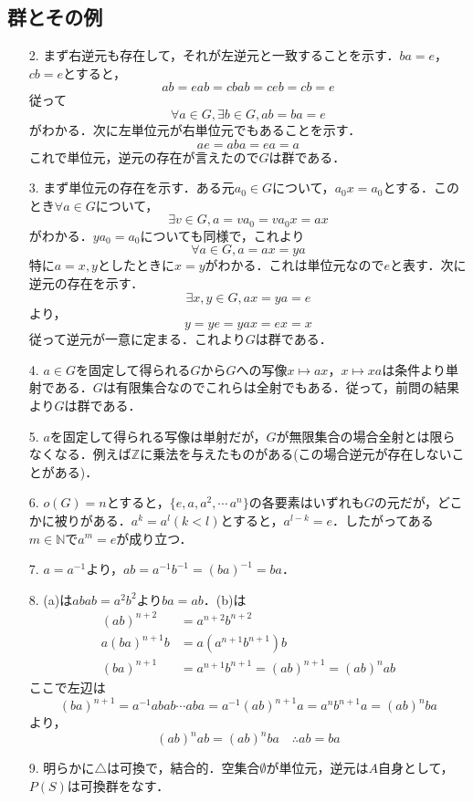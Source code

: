 \documentclass[a4paper,10pt,uplatex]{jsarticle}
\newcommand{\N}{\mathbb{N}}
\newcommand{\Z}{\mathbb{Z}}
\newcommand{\inv}[1]{{(#1)}^{-1}}
\numberwithin{equation}{section}
\theoremstyle{mystyle}
\begin{document}
\subsection{群とその例}
\begin{itemize}
    \item[2.] まず右逆元も存在して，それが左逆元と一致することを示す．$ba = e$，$cb=e$とすると，
    \[ ab = eab = cbab = ceb = cb = e \]
    従って
    \[ \forall a \in G, \exists b \in G, ab = ba = e \]
    がわかる．次に左単位元が右単位元でもあることを示す．
    \[ ae = aba = ea = a \]
    これで単位元，逆元の存在が言えたので$G$は群である．
    
    \item[3.] まず単位元の存在を示す．ある元$a_0 \in G$について，$a_0 x = a_0$とする．このとき$\forall a \in G$について，
    \[ \exists v \in G, a = va_0 = va_0x = ax \]
    がわかる．$y a_0 = a_0$についても同様で，これより
    \[ \forall a \in G, a = ax = ya \]
    特に$a = x,y$としたときに$x = y$がわかる．これは単位元なので$e$と表す．次に逆元の存在を示す．
    \[ \exists x,y \in G, ax = ya = e \]
    より，
    \[ y = ye = yax = ex = x \]
    従って逆元が一意に定まる．これより$G$は群である．

    \item[4.] $a \in G$を固定して得られる$G$から$G$への写像$x \mapsto ax$，$x \mapsto xa$は条件より単射である．$G$は有限集合なのでこれらは全射でもある．従って，前問の結果より$G$は群である．
    
    \item[5.] $a$を固定して得られる写像は単射だが，$G$が無限集合の場合全射とは限らなくなる．例えば$\Z$に乗法を与えたものがある(この場合逆元が存在しないことがある)．
    
    \item[6.] $o(G) = n$とすると，$\{e, a, a^2, \cdots\, a^n\}$の各要素はいずれも$G$の元だが，どこかに被りがある．$a^k = a^l(k < l)$とすると，$a^{l-k} = e$．したがってある$m \in \N$で$a^m = e$が成り立つ．
    
    \item[7.] $a = a^{-1}$より，$ab = a^{-1}b^{-1} = \inv{ba} = ba$．
    
    \item[8.] (a)は$abab = a^2b^2$より$ba = ab$．(b)は
    \begin{align}
        (ab)^{n+2} &= a^{n+2}b^{n+2} \\
        a(ba)^{n+1}b &= a(a^{n+1}b^{n+1})b \\
        (ba)^{n+1} &= a^{n+1}b^{n+1} = (ab)^{n+1} = (ab)^n ab
    \end{align}
    ここで左辺は
    \begin{equation}
        (ba)^{n+1} = a^{-1}abab \cdots aba = a^{-1}(ab)^{n+1}a = a^{n}b^{n+1}a = (ab)^n ba
    \end{equation}
    より，
    \[ (ab)^n ab = (ab)^n ba \quad \therefore ab = ba \]

    \item [9.] 明らかに$\triangle$は可換で，結合的．空集合$\emptyset$が単位元，逆元は$A$自身として，$P(S)$は可換群をなす．
\end{itemize}
\end{document}
